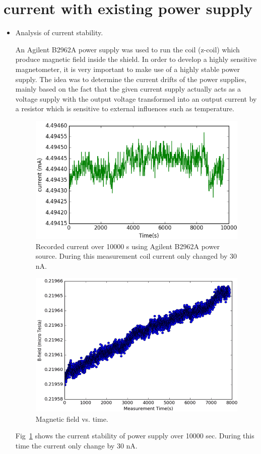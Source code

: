    \section{current with existing power supply}
   \begin{itemize}
   \item Analysis of current stability.
   
 An Agilent B2962A power supply was used to run the coil (z-coil) which produce magnetic field inside the shield. In order to develop a highly sensitive magnetometer, it is very important to make use of a highly stable power supply. The idea was to determine the current drifts of the power supplies, mainly based on the fact that the given current supply actually acts as a voltage supply with the output voltage transformed into an output current by a resistor which is sensitive to external influences such as temperature.
  \begin{figure}[h]
\centering
\includegraphics[width=0.6\linewidth]{figures/current}
\caption{Recorded current over 10000 s using Agilent B2962A power source. During this measurement coil current only changed by 30 nA.\label{fig:current} }
\end{figure}
     \begin{figure}[h]
\centering
\includegraphics[width=0.6\linewidth]{figures/field_current_study.png}
\caption{Magnetic field vs. time. \label{fig:field_current} }
\end{figure}


 Fig~\ref{fig:current} shows the current stability of power supply over 10000 sec. During this time the current only change by 30 nA.  
  \begin{figure}
    \centering
 

\end{figure}
\end{itemize}
